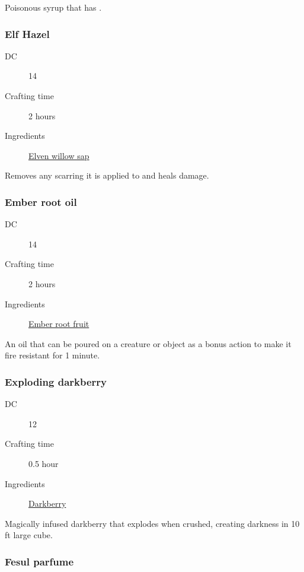 Poisonous syrup that has \poison\poison\poison.

\subsubsection{Elf Hazel}
\label{Elf Hazel}

\begin{description}
\item [DC] 14 \medicine
\item [Crafting time] 2 hours
\item [Ingredients] \hyperref[Elven Willow]{Elven willow sap}
\end{description}

Removes any scarring it is applied to and heals  damage.

\subsubsection{Ember root oil}
\label{Ember root oil}

\begin{description}
\item [DC] 14 \survival
\item [Crafting time] 2 hours
\item [Ingredients] \hyperref[Ember root]{Ember root fruit}
\end{description}

An oil that can be poured on a creature or object as a bonus action to make it fire resistant for 1 minute.

\subsubsection{Exploding darkberry}
\label{Exploding darkberry}

\begin{description}
\item [DC] 12 \arcana
\item [Crafting time] 0.5 hour
\item [Ingredients] \hyperref[Darkberry]{Darkberry}
\end{description}

Magically infused darkberry that explodes when crushed, creating darkness in 10 ft large cube.

\subsubsection{Fesul parfume}
\label{Fesul parfume}

